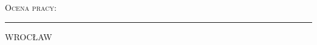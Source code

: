 \begin{titlepage}
\begin{center}
\begin{flushright}
\begin{minipage}[t]{9.68cm}
\begin{flushleft}
\begin{large}

					\textsc{Ocena pracy:}\newline
				\end{large}
			\end{flushleft}
		\end{minipage}
	\end{flushright}
	\vfill
	\rule[-0.3ex]{\textwidth}{1pt}
	WROCŁAW \rok
\end{center}
\end{titlepage}